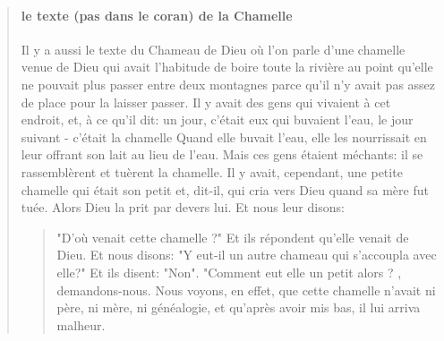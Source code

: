\begin{quote}
\paragraph{le texte (pas dans le coran) de la Chamelle}
Il y a aussi le texte du Chameau de Dieu où l'on parle d'une chamelle venue de Dieu qui avait l'habitude de boire toute la rivière au point qu'elle ne pouvait plus passer entre deux montagnes parce qu'il n'y avait pas assez de place pour la laisser passer. Il y avait des gens qui vivaient à cet endroit, et, à ce qu'il dit: un jour, c'était eux qui buvaient l'eau, le jour suivant - c'était la chamelle Quand elle buvait l'eau, elle les nourrissait en leur offrant son lait au lieu de l'eau. Mais ces gens étaient méchants: il se rassemblèrent et tuèrent la chamelle. Il y avait, cependant, une petite chamelle qui était son petit et, dit-il, qui cria vers Dieu quand sa mère fut tuée. Alors Dieu la prit par devers lui. Et nous leur disons: \begin{quote}
    "D'où venait cette chamelle ?" Et ils répondent qu'elle venait de Dieu. Et nous disons: "Y eut-il un autre chameau qui s'accoupla avec elle?" Et ils disent: "Non". "Comment eut elle un petit alors ? , demandons-nous. Nous voyons, en effet, que cette chamelle n'avait ni père, ni mère, ni généalogie, et qu'après avoir mis bas, il lui arriva malheur.
\end{quote} 

\end{quote}
